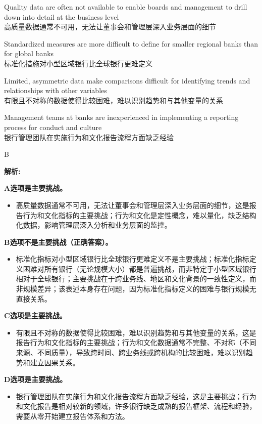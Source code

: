 \documentclass{article}
\newenvironment{explanation}
{\textbf{解析:}\par}
{\par}
\begin{document}
\begin{choices}
    \item Quality data are often not available to enable boards and management to drill down into detail at the business level\\
    高质量数据通常不可用，无法让董事会和管理层深入业务层面的细节
    \item Standardized measures are more difficult to define for smaller regional banks than for global banks\\
    标准化措施对小型区域银行比全球银行更难定义
    \item Limited, asymmetric data make comparisons difficult for identifying trends and relationships with other variables\\
    有限且不对称的数据使得比较困难，难以识别趋势和与其他变量的关系
    \item Management teams at banks are inexperienced in implementing a reporting process for conduct and culture\\
    银行管理团队在实施行为和文化报告流程方面缺乏经验
\end{choices}

\begin{correctanswer}
    B
\end{correctanswer}

\begin{explanation}
    \textbf{A选项是主要挑战。}
    \begin{itemize}
        \item 高质量数据通常不可用，无法让董事会和管理层深入业务层面的细节，这是报告行为和文化指标的主要挑战；行为和文化是定性概念，难以量化，缺乏结构化数据，影响管理层深入分析和业务层面的监控。
    \end{itemize}

    \textbf{B选项不是主要挑战（正确答案）。}
    \begin{itemize}
        \item 标准化指标对小型区域银行比全球银行更难定义不是主要挑战；标准化指标定义困难对所有银行（无论规模大小）都是普遍挑战，而非特定于小型区域银行相对于全球银行；主要挑战在于跨业务线、地区和文化背景的一致性定义，而非规模差异；该表述本身存在问题，因为标准化指标定义的困难与银行规模无直接关系。
    \end{itemize}

    \textbf{C选项是主要挑战。}
    \begin{itemize}
        \item 有限且不对称的数据使得比较困难，难以识别趋势和与其他变量的关系，这是报告行为和文化指标的主要挑战；行为和文化数据通常不完整、不对称（不同来源、不同质量），导致跨时间、跨业务线或跨机构的比较困难，难以识别趋势和建立因果关系。
    \end{itemize}

    \textbf{D选项是主要挑战。}
    \begin{itemize}
        \item 银行管理团队在实施行为和文化报告流程方面缺乏经验，这是主要挑战；行为和文化报告是相对较新的领域，许多银行缺乏成熟的报告框架、流程和经验，需要从零开始建立报告体系和方法。
    \end{itemize}
\end{explanation}
\end{document}
